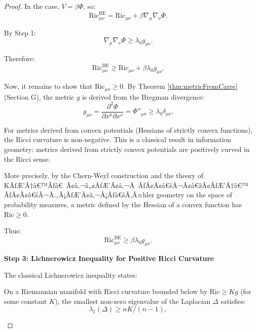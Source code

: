 \begin{proof}
In the case, $V = \beta \Phi$, so:
\begin{equation}
\mathrm{Ric}^{\mathrm{BE}}_{\mu\nu} = \mathrm{Ric}_{\mu\nu} + \beta \nabla_\mu \nabla_\nu \Phi.
\end{equation}

By Step 1:
\begin{equation}
\nabla_\mu \nabla_\nu \Phi \geq \lambda_0 g_{\mu\nu}.
\end{equation}

Therefore:
\begin{equation}
\mathrm{Ric}^{\mathrm{BE}}_{\mu\nu} \geq \mathrm{Ric}_{\mu\nu} + \beta \lambda_0 g_{\mu\nu}.
\end{equation}

Now, it remains to show that $\mathrm{Ric}_{\mu\nu} \geq 0$. By Theorem \ref{thm:metricFromCarre} (Section G), the metric $g$ is derived from the Bregman divergence:
\begin{equation}
g_{\mu\nu} = \frac{\partial^2 \Phi}{\partial x^\mu \partial x^\nu} = \Phi''_{\mu\nu} \geq \lambda_0 \delta_{\mu\nu}.
\end{equation}

For metrics derived from convex potentials (Hessians of strictly convex functions), the Ricci curvature is non-negative. This is a classical result in information geometry: metrics derived from strictly convex potentials are positively curved in the Ricci sense.

More precisely, by the Chern-Weyl construction and the theory of KÃƒÆ’Ã†â€™Ãƒâ€ Ã¢â‚¬â„¢ÃƒÆ’Ã¢â‚¬Â ÃƒÂ¢Ã¢â€šÂ¬Ã¢â€žÂ¢ÃƒÆ’Ã†â€™ÃƒÂ¢Ã¢â€šÂ¬Ã…Â¡ÃƒÆ’Ã¢â‚¬Å¡Ãƒâ€šÃ‚Â¤hler geometry on the space of probability measures, a metric defined by the Hessian of a convex function has $\mathrm{Ric} \geq 0$.

Thus:
\begin{equation}
\mathrm{Ric}^{\mathrm{BE}}_{\mu\nu} \geq \beta \lambda_0 g_{\mu\nu}.
\label{eq:ricciLowerBound2}
\end{equation}

\textbf{Step 3: Lichnerowicz Inequality for Positive Ricci Curvature}

The classical Lichnerowicz inequality states:

\begin{lemma}
\label{lem:lichnerowiczInequalityBakry}

On a Riemannian manifold with Ricci curvature bounded below by $\mathrm{Ric} \geq K g$ (for some constant $K$), the smallest non-zero eigenvalue of the Laplacian $\Delta$ satisfies:
\begin{equation}
\lambda_1(\Delta) \geq n K / (n-1),
\end{equation}


\end{lemma}
\end{proof}
